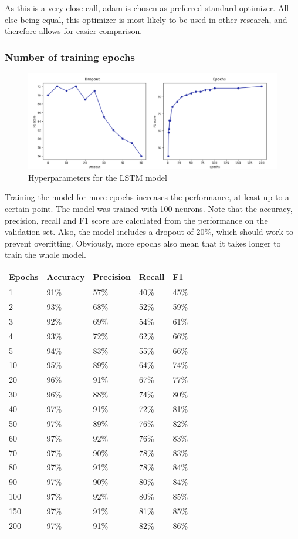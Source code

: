 \documentclass[
a4paper,
pagesize,
pdftex,
12pt,
ngerman,
fleqn,
final,
]{scrartcl}
\begin{document}
	As this is a very close call, adam is chosen as preferred standard optimizer. All else being equal, this optimizer is most likely to be used in other research, and therefore allows for easier comparison.
	
	\subsubsection{Number of training epochs}
			\begin{figure}[h]
		\centering
		\includegraphics[width=1\textwidth]{img/hyper2}
		\caption{Hyperparameters for the LSTM model}
		\label{fig:hyper2}
	\end{figure}
	
	Training the model for more epochs increases the performance, at least up to a certain point. The model was trained with 100 neurons. Note that the accuracy, precision, recall and F1 score are calculated from the performance on the validation set. Also, the model includes a dropout of 20\%, which should work to prevent overfitting. Obviously, more epochs also mean that it takes longer to train the whole model.
	
	\begin{tabular}{ | p{2cm} || p{2cm}|p{2cm}|p{2cm}|p{2cm}|  }
		\hline
		Epochs & Accuracy & Precision & Recall & F1 \\
		\hline
		1 & 91\% &  57\% &  40\% &  45\% \\
		2 & 93\% &  68\% &  52\% &  59\% \\
		3 &  92\%&  69\%&   54\%&  61\% \\
		4 &  93\%&  72\%&   62\%&  66\% \\
		5 &  94\%&  83\%&   55\%&  66\% \\
		10 &  95\%&  89\%&   64\%&  74\% \\
		20 &  96\%&  91\%&   67\%&  77\% \\
		30 &  96\%&  88\%&   74\%&  80\% \\
		40 &  97\%&  91\%&   72\%&  81\% \\
		50 &  97\%&  89\%&   76\%&  82\% \\
		60 &  97\%&  92\%&   76\%&  83\% \\
		70 &  97\%&  90\%&   78\%&  83\% \\
		80 &  97\%&  91\%&   78\%&  84\% \\
		90 &  97\%&  90\%&   80\%&  84\% \\
		100 &  97\%&  92\%&   80\%&  85\% \\
		150 &  97\%&  91\%&   81\%&  85\% \\
		200 &  97\%&  91\%&   82\%&  86\% \\
		\hline
		\hline
	\end{tabular}
	
\end{document}
